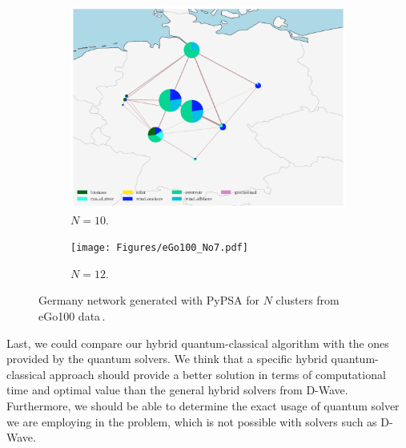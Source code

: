 \begin{figure}[H]
\begin{subfigure}[c]{0.5\linewidth}
\includegraphics[width=\linewidth]{Figures/eGo100_No6.pdf}
\caption{$N=10$.}
\label{fig:3c}
\end{subfigure}\hfill    
\begin{subfigure}[c]{0.5\linewidth}
\texttt{[image: Figures/eGo100\_No7.pdf]}
\caption{$N=12$.}
\label{fig:3d}
\end{subfigure}
    
\caption{Germany network generated with PyPSA for $N$ clusters from eGo100 data\,\cite{Mueller2018}.}
\label{fig:GeneralNetworks}
\end{figure}
Last, we could compare our hybrid quantum-classical algorithm with the ones provided by the quantum solvers. We think that a specific hybrid quantum-classical approach should provide a better solution in terms of computational time and optimal value than the general hybrid solvers from D-Wave. Furthermore, we should be able to determine the exact usage of quantum solver we are employing in the problem, which is not possible with solvers such as D-Wave.